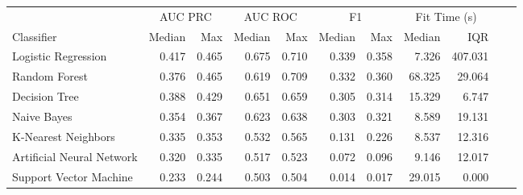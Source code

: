\begin{tabular}{lrrrrrrrrrr} \toprule
& \multicolumn{2}{c}{AUC PRC} & \multicolumn{2}{c}{AUC ROC} & \multicolumn{2}{c}{F1} & \multicolumn{2}{c}{Fit Time (s)} \\
Classifier & Median & Max & Median & Max & Median & Max & Median & IQR \\ \midrule
Logistic Regression       &   0.417 &  0.465 &   0.675 &  0.710 &  0.339 &  0.358 &  7.326 &  407.031 \\
Random Forest             &   0.376 &  0.465 &   0.619 &  0.709 &  0.332 &  0.360 &  68.325 &   29.064 \\
Decision Tree             &   0.388 &  0.429 &   0.651 &  0.659 &  0.305 &  0.314 &  15.329 &    6.747 \\
Naive Bayes               &   0.354 &  0.367 &   0.623 &  0.638 &  0.303 &  0.321 &  8.589 &   19.131 \\
K-Nearest Neighbors       &   0.335 &  0.353 &   0.532 &  0.565 &  0.131 &  0.226 &  8.537 &   12.316 \\
Artificial Neural Network &   0.320 &  0.335 &   0.517 &  0.523 &  0.072 &  0.096 &  9.146 &   12.017 \\
Support Vector Machine    &   0.233 &  0.244 &   0.503 &  0.504 &  0.014 &  0.017 &  29.015 &    0.000 \\
\bottomrule \end{tabular}
